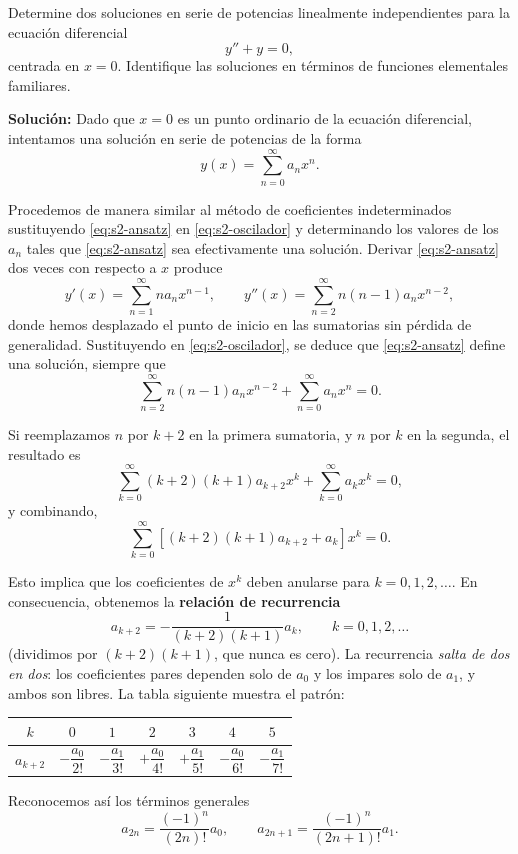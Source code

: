 \begin{example}\label{ex:s2-cos}
    Determine dos soluciones en serie de potencias linealmente independientes para la ecuación diferencial
\begin{equation}
y'' + y = 0,
\label{eq:s2-oscilador}
\end{equation}
centrada en $x = 0$. Identifique las soluciones en términos de funciones elementales familiares.
 
\noindent \textbf{Solución:} \quad Dado que $x = 0$ es un punto ordinario de la ecuación diferencial, intentamos una solución en serie de potencias de la forma
\begin{equation}
y(x) = \sum_{n=0}^{\infty} a_n x^n.
\label{eq:s2-ansatz}
\end{equation}
 
Procedemos de manera similar al método de coeficientes indeterminados sustituyendo \eqref{eq:s2-ansatz} en \eqref{eq:s2-oscilador} y determinando los valores de los $a_n$ tales que \eqref{eq:s2-ansatz} sea efectivamente una solución. Derivar \eqref{eq:s2-ansatz} dos veces con respecto a $x$ produce
\[ y'(x) = \sum_{n=1}^{\infty} n a_n x^{n-1}, \qquad y''(x) = \sum_{n=2}^{\infty} n(n-1)a_n x^{n-2}, \]
donde hemos desplazado el punto de inicio en las sumatorias sin pérdida de generalidad. Sustituyendo en \eqref{eq:s2-oscilador}, se deduce que \eqref{eq:s2-ansatz} define una solución, siempre que
\[ \sum_{n=2}^{\infty} n(n-1)a_n x^{n-2} + \sum_{n=0}^{\infty} a_n x^n = 0. \]
 
Si reemplazamos $n$ por $k + 2$ en la primera sumatoria, y $n$ por $k$ en la segunda, el resultado es
\[ \sum_{k=0}^{\infty} (k+2)(k+1)a_{k+2}x^k + \sum_{k=0}^{\infty} a_k x^k = 0, \]
y combinando,
\[ \sum_{k=0}^{\infty} [(k+2)(k+1)a_{k+2} + a_k]x^k = 0. \]
 
Esto implica que los coeficientes de $x^k$ deben anularse para $k = 0, 1, 2, \dots$. En consecuencia, obtenemos la \textbf{relación de recurrencia}
\begin{equation}
a_{k+2} = -\frac{1}{(k+2)(k+1)}a_k, \qquad k = 0, 1, 2, \dots
\label{eq:s2-rec-cos}
\end{equation}
(dividimos por $(k+2)(k+1)$, que nunca es cero). La recurrencia \emph{salta de dos en dos}: los coeficientes pares dependen solo de $a_0$ y los impares solo de $a_1$, y ambos son libres. La tabla siguiente muestra el patrón:
\begin{center}
\small
\begin{tabular}{|c|c|c|c|c|c|c|}
\hline
\rowcolor{bbe!15}$k$ & $0$ & $1$ & $2$ & $3$ & $4$ & $5$ \\ \hline
$a_{k+2}$ & $-\dfrac{a_0}{2!}$ & $-\dfrac{a_1}{3!}$ & $+\dfrac{a_0}{4!}$ & $+\dfrac{a_1}{5!}$ & $-\dfrac{a_0}{6!}$ & $-\dfrac{a_1}{7!}$ \\ \hline
\end{tabular}
\end{center}
Reconocemos así los términos generales
\begin{equation}
\boxed{ a_{2n} = \frac{(-1)^n}{(2n)!}a_0, \qquad a_{2n+1} = \frac{(-1)^n}{(2n+1)!}a_1. }
\label{eq:s2-coef-cos}
\end{equation}
 

\end{example}

